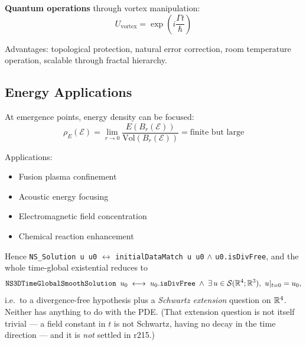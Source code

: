 \textbf{Quantum operations} through vortex manipulation:
\begin{equation}
U_{\text{vortex}} = \exp\left(i\frac{\Gamma t}{\hbar}\right)
\end{equation}

Advantages: topological protection, natural error correction, room temperature operation, scalable through fractal hierarchy.

\subsection{Energy Applications}

At emergence points, energy density can be focused:
\begin{equation}
\rho_E(\mathcal{E}) = \lim_{r \to 0} \frac{E(B_r(\mathcal{E}))}{\text{Vol}(B_r(\mathcal{E}))} = \text{finite but large}
\end{equation}

Applications:
\begin{itemize}
\item Fusion plasma confinement
\item Acoustic energy focusing
\item Electromagnetic field concentration
\item Chemical reaction enhancement
\end{itemize}

Hence \texttt{NS\_Solution u u0} $\leftrightarrow$
\texttt{initialDataMatch u u0} $\wedge$ \texttt{u0.isDivFree}, and the whole
time-global existential reduces to
\[
  \texttt{NS3DTimeGlobalSmoothSolution } u_0 \;\longleftrightarrow\;
  u_0.\texttt{isDivFree} \;\wedge\; \exists\,u \in \mathcal{S}(\mathbb{R}^4;\mathbb{R}^3),\
  u|_{t=0} = u_0 ,
\]
i.e.\ to a divergence-free hypothesis plus a \emph{Schwartz extension} question
on $\mathbb{R}^4$. Neither has anything to do with the PDE. (That extension question is
not itself trivial --- a field constant in $t$ is not Schwartz, having no decay
in the time direction --- and it is \emph{not} settled in r215.)

